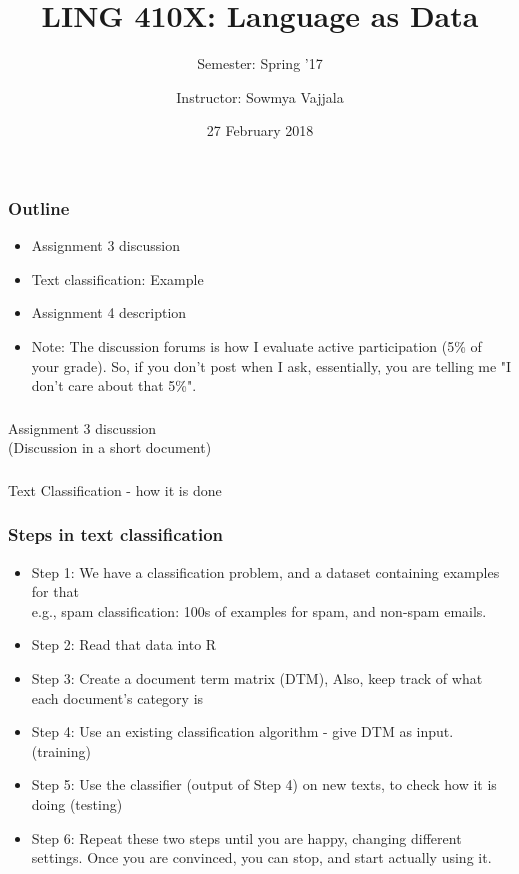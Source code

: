 \documentclass{beamer}
\author[Sowmya Vajjala]{Instructor: Sowmya Vajjala}
\title[LING 410X]{LING 410X: Language as Data}
\subtitle{Semester: Spring '17}
\date{27 February 2018}
\institute{Iowa State University, USA}
\begin{document}
\begin{frame}\titlepage
\end{frame}

\begin{frame}
\frametitle{Outline}
\begin{itemize}
\item Assignment 3 discussion
\item Text classification: Example
\item Assignment 4 description
\item Note: The discussion forums is how I evaluate active participation (5\% of your grade). So, if you don't post when I ask, essentially, you are telling me "I don't care about that 5\%".
\end{itemize}
\end{frame}

\begin{frame}
\frametitle{}
\Large Assignment 3 discussion \\
\small (Discussion in a short document)
\end{frame}

\begin{frame}
\frametitle{}
\Large Text Classification - how it is done
\end{frame}

\begin{frame}
\frametitle{Steps in text classification}
\begin{itemize}
\item  Step 1: We have a classification problem, and a dataset containing examples for that
\\ e.g., spam classification: 100s of examples for spam, and non-spam emails. \pause
\item Step 2: Read that data into R 
\item Step 3: Create a document term matrix (DTM), Also, keep track of what each document's category is \pause
\item Step 4: Use an existing classification algorithm - give DTM as input. (training)
\item Step 5: Use the classifier (output of Step 4) on new texts, to check how it is doing (testing) \pause
\item Step 6: Repeat these two steps until you are happy, changing different settings. Once you are convinced, you can stop, and start actually using it.
\end{itemize}
\end{frame}
\end{document}
